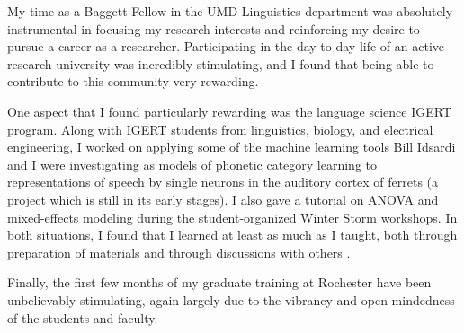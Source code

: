 \documentclass[12pt]{article}
\begin{document}

My time as a Baggett Fellow in the UMD Linguistics department was absolutely instrumental in focusing my research interests and reinforcing my desire to pursue a career as a researcher.  Participating in the day-to-day life of an active research university was incredibly stimulating, and I found that being able to contribute to this community very rewarding.  

One aspect that I found particularly rewarding was the language science IGERT program.  Along with IGERT students from linguistics, biology, and electrical engineering, I worked on applying some of the machine learning tools Bill Idsardi and I were investigating as models of phonetic category learning to representations of speech by single neurons in the auditory cortex of ferrets (a project which is still in its early stages).  I also gave a tutorial on ANOVA and mixed-effects modeling during the student-organized Winter Storm workshops.  In both situations, I found that I learned at least as much as I taught, both through preparation of materials and through discussions with others
.

Finally, the first few months of my graduate training at Rochester have been unbelievably stimulating, again largely due to the vibrancy and open-mindedness of the students and faculty.  
\end{document}
